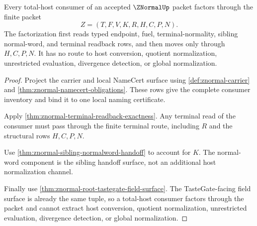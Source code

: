 \begin{theorem}
\label{thm:znormal-total-host-consumer-factorization}
Every total-host consumer of an accepted $\ZNormalUp$ packet factors through
the finite packet
$$
Z=(T,F,V,K,R,H,C,P,N).
$$
The factorization first reads typed endpoint, fuel, terminal-normality,
sibling normal-word, and terminal readback rows, and then moves only through
$H,C,P,N$. It has no route to host conversion, quotient normalization,
unrestricted evaluation, divergence detection, or global normalization.
\end{theorem}
\begin{proof}
Project the carrier and local NameCert surface using
\autoref{def:znormal-carrier} and
\autoref{thm:znormal-namecert-obligations}. These rows give the complete
consumer inventory and bind it to one local naming certificate.

Apply \autoref{thm:znormal-terminal-readback-exactness}. Any terminal read of
the consumer must pass through the finite terminal route, including $R$ and
the structural rows $H,C,P,N$.

Use \autoref{thm:znormal-sibling-normalword-handoff} to account for $K$. The
normal-word component is the sibling handoff surface, not an additional host
normalization channel.

Finally use \autoref{thm:znormal-root-tastegate-field-surface}. The
TasteGate-facing field surface is already the same tuple, so a total-host
consumer factors through the packet and cannot extract host conversion,
quotient normalization, unrestricted evaluation, divergence detection, or
global normalization.
\end{proof}
